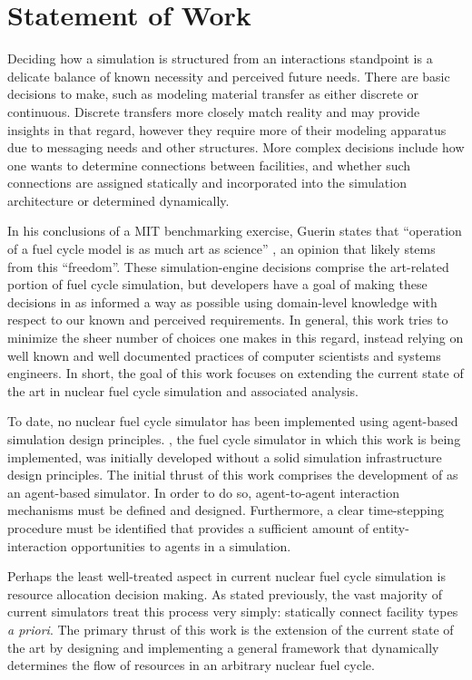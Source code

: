 
\section{Statement of Work}

Deciding how a simulation is structured from an interactions standpoint is a
delicate balance of known necessity and perceived future needs. There are basic
decisions to make, such as modeling material transfer as either discrete or
continuous. Discrete transfers more closely match reality and may provide
insights in that regard, however they require more of their modeling apparatus
due to messaging needs and other structures. More complex decisions include how
one wants to determine connections between facilities, and whether such
connections are assigned statically and incorporated into the simulation
architecture or determined dynamically.

In his conclusions of a MIT benchmarking exercise, Guerin states that
``operation of a fuel cycle model is as much art as science''
\cite{guerin_benchmark_2009}, an opinion that likely stems from this
``freedom''. These simulation-engine decisions comprise the art-related portion
of fuel cycle simulation, but developers have a goal of making these decisions
in as informed a way as possible using domain-level knowledge with respect to
our known and perceived requirements. In general, this work tries to minimize
the sheer number of choices one makes in this regard, instead relying on well
known and well documented practices of computer scientists and systems
engineers. In short, the goal of this work focuses on extending the current
state of the art in nuclear fuel cycle simulation and associated analysis.

To date, no nuclear fuel cycle simulator has been implemented using agent-based
simulation design principles. \Cyclus, the fuel cycle simulator in which this
work is being implemented, was initially developed without a solid simulation
infrastructure design principles. The initial thrust of this work comprises the
development of \Cyclus as an agent-based simulator. In order to do so,
agent-to-agent interaction mechanisms must be defined and designed. Furthermore,
a clear time-stepping procedure must be identified that provides a sufficient
amount of entity-interaction opportunities to agents in a simulation. 

Perhaps the least well-treated aspect in current nuclear fuel cycle simulation
is resource allocation decision making. As stated previously, the vast majority
of current simulators treat this process very simply: statically connect facility
types \textit{a priori}. The primary thrust of this work is the extension of the
current state of the art by designing and implementing a general framework that
dynamically determines the flow of resources in an arbitrary nuclear fuel cycle. 

